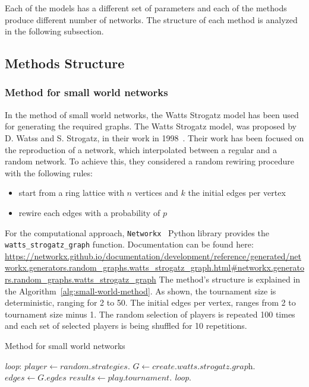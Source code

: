 Each of the models has a different set of parameters and each of the methods
produce different number of networks. The structure of each method is analyzed in
the following subsection.

\subsection{Methods Structure}
\label{sub:experiments-structure}
\subsubsection{Method for small world networks}

In the method of small world networks, the Watts Strogatz model has been used
for generating the required graphs.
The Watts Strogatz model, was proposed by D. Watss and S. Strogatz,
in their work in 1998~\cite{Watts1998}. Their work has been focused on the reproduction
of a network, which interpolated between a regular and a random network.
To achieve this, they considered a random rewiring procedure with the following
rules:

\begin{itemize}
	\item start from a ring lattice with \(n\) vertices and \(k\) the initial edges per vertex
	\item rewire each edges with a probability of \(p\)
\end{itemize}

For the computational approach, \texttt{Networkx}~\cite{networkx} Python library provides the
\texttt{watts\_strogatz\_graph} function. Documentation can be found here:
\url{https://networkx.github.io/documentation/development/reference/generated/networkx.generators.random_graphs.watts_strogatz_graph.html#networkx.generators.random_graphs.watts_strogatz_graph}
The method's structure is explained
in the Algorithm~\ref{alg:small-world-method}. As shown, the tournament size is
deterministic, ranging for 2 to 50. The initial edges per vertex, ranges from 2
to tournament size minus 1. The random selection of players is repeated 100 times
and each set of selected players is being shuffled for 10 repetitions.

\begin{algorithm}
	\caption{Method for small world networks}\label{alg:small-world-method}
	\begin{algorithmic}
		\BState \emph{loop}:
		\State $player \gets \textit{random.strategies}$.
		\State $G \gets \textit{create.watts.strogatz.graph}$.
		\State $edges \gets \textit{G.egdes}$
		\State $results \gets \textit{play.tournament}$.
		\emph{loop}.
		\EndFor
		\EndFor
		\EndFor
		\EndFor
		\EndProcedure
	\end{algorithmic}
\end{algorithm}

